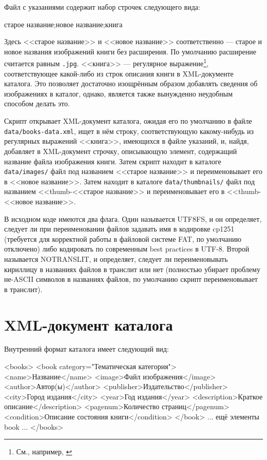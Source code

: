 \documentclass[a4paper,14pt,oneside]{extreport}
\begin{document}
Файл с указаниями содержит набор строчек следующего вида:
\begin{VerbatimCode}
старое название;новое название;книга
\end{VerbatimCode}

Здесь <<старое название>> и <<новое название>> соответственно --- старое и новое названия изображений книги без расширения. По умолчанию расширение считается равным \verb'.jpg'. <<книга>> --- регулярное выражение\footnote{См., например, \cite{regexp-book}}, соответствующее какой-либо из строк описания книги в XML-документе каталога. Это позволяет достаточно изощрённым образом добавлять сведения об изображениях в каталог, однако, является также вынужденно неудобным способом делать это.

Скрипт открывает XML-документ каталога, ожидая его по умолчанию в файле \verb'data/books-data.xml', ищет в нём строку, соответствующую какому-нибудь из регулярных выражений <<книга>>, имеющихся в файле указаний, и, найдя, добавляет в XML-документ строчку, описывающую элемент, содержащий название файла изображения книги. Затем скрипт находит в каталоге \verb'data/images/' файл под названием <<старое название>> и переименовывает его в <<новое название>>. Затем находит в каталоге \verb'data/thumbnails/' файл под названием <<thumb-<<старое название>> и переименовывает его в <<thumb-<<новое название>>.

В исходном коде имеются два флага. Один называется UTF8FS, и он определяет, следует ли при переименовании файлов задавать имя в кодировке cp1251 (требуется для корректной работы в файловой системе FAT, по умолчанию отключено) либо кодировать по современным best practices в UTF-8. Второй называется NOTRANSLIT, и определяет, следует ли переименовывать кириллицу в названиях файлов в транслит или нет (полностью убирает проблему не-ASCII символов в названиях файлов, по умолчанию скрипт переименовывает в транслит).

\section{XML-документ каталога}
Внутренний формат каталога имеет следующий вид:
\begin{VerbatimCode}
<books>
  <book category="Тематическая категория">
    <name>Название</name>
    <image>Файл изображения</image>
    <author>Автор(ы)</author>
    <publisher>Издательство</publisher>
    <city>Город издания</city>
    <year>Год издания</year>
    <description>Краткое описание</description>
    <pagenum>Количество страниц</pagenum>
    <condition>Описание состояния книги</condition>
  </book>
... ещё элементы book ...
</books>
\end{VerbatimCode}
\end{document}
